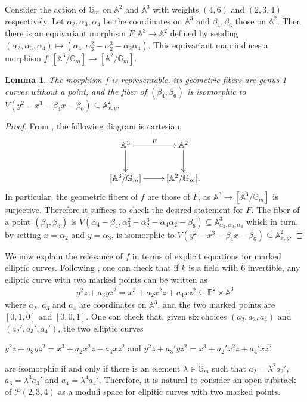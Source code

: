 \documentclass[11pt]{amsart}
\newtheorem{lemma}[theorem]{Lemma}
\theoremstyle{definition}
\theoremstyle{remark}
\newcommand{\bP}{{\mathbb P}}
\newcommand{\bA}{{\mathbb A}}
\newcommand{\calP}{\mathcal P}
\newcommand{\bG}{\mathbb{G}}
\begin{document}
Consider the action of $\bG_m$ on  $\mathbb{A}^2$ and $\bA^3$ with weights $(4,6)$ and $(2,3,4)$ respectively. Let $\alpha_2,\alpha_3,\alpha_4$ be the coordinates on $\bA^3$ and $\beta_4,\beta_6$ those on $\bA^2$. Then there is an equivariant morphism $F:\mathbb{A}^3\to \mathbb{A}^2$ defined by sending $(\alpha_2, \alpha_3, \alpha_4)\mapsto (\alpha_4, \alpha_3^2 - \alpha_2^3 -\alpha_2\alpha_4)$.
This equivariant map induces a morphism $f: [\mathbb{A}^3/\bG_m] \to [\mathbb{A}^2/\bG_m]$.
\begin{lemma}\label{lemma_fibers_elliptic_curves_without_a_pt}
The morphism $f$ is representable, its geometric fibers are genus 1 curves without a point, and the fiber of $(\beta_4,\beta_6)$ is isomorphic to $V(y^2-x^3 - \beta_4x -\beta_6)\subseteq \mathbb{A}^2_{x,y}$.
\end{lemma}
\begin{proof}
From \cite[Exercise 10.F]{Ols16}, the following diagram is cartesian:
$$\xymatrix{\mathbb{A}^3 \ar[d] \ar[r]^F & \mathbb{A}^2\ar[d]\\[\mathbb{A}^3/\bG_m] \ar[r] & [\mathbb{A}^2/\bG_m].}$$
In particular, the geometric fibers of $f$ are those of $F$, as $\mathbb{A}^3\to [\mathbb{A}^3/\bG_m]$ is surjective. Therefore it suffices to check the desired statement for $F$. The fiber of a point $(\beta_4,\beta_6)$ is $V(\alpha_4 - \beta_4, \alpha_3^2 - \alpha_2^3 -\alpha_4\alpha_2 - \beta_6) \subseteq \bA^3_{\alpha_2, \alpha_3, \alpha_4}$ which in turn, by setting $ x = \alpha_2$ and $y = \alpha_3$, is isomorphic to $V(y^2-x^3 - \beta_4x -\beta_6)\subseteq \mathbb{A}^2_{x,y}$.
\end{proof}
We now explain the relevance of $f$ in terms of explicit equations for marked elliptic curves. Following \cite[Section III.3]{Silverman}, one can check that if $k$ is a field with 6 invertible, any elliptic curve with two marked points can be written as 
\begin{align}y^2z + a_3yz^2 = x^3 + a_2x^2z + a_4xz^2\subseteq \bP^2\times \bA^3\end{align}
where $a_2$, $a_3$ and $a_4$ are coordinates on $\mathbb{A}^3$, and the two marked points are $[0,1,0]$ and $[0,0,1]$. 
One can check that, given six choices $(a_2,a_3,a_4)$ and $(a_2',a_3',a_4')$, the two elliptic curves \begin{center}$y^2z + a_3yz^2 = x^3 + a_2x^2z + a_4xz^2$ and $y^2z + a_3'yz^2 = x^3 + a_2'x^2z + a_4'xz^2$\end{center} are isomorphic if and only if there is an element $\lambda \in \bG_m$ such that $a_2 = \lambda^2 a_2'$, $a_3 = \lambda^3 a_3'$ and $a_4 = \lambda^4 a_4'$.
Therefore, it is natural to consider an open substack of $\calP(2,3,4)$ as a moduli space for ellpitic curves with two marked points.
\end{document}
